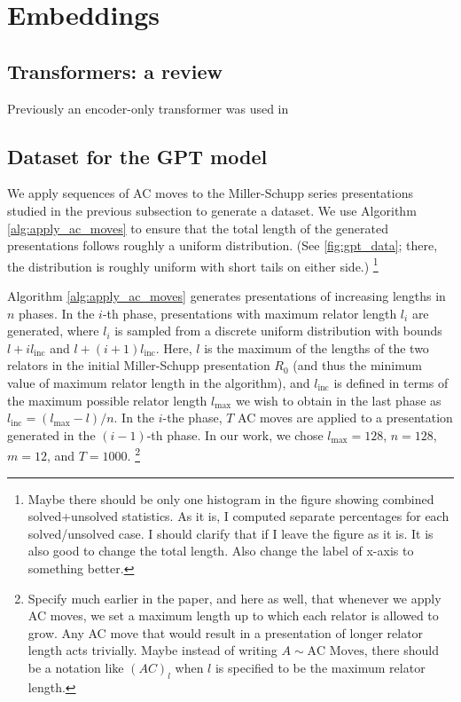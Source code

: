 
\section{Embeddings}

\subsection{Transformers: a review}

Previously an encoder-only transformer was used in

\subsection{Dataset for the GPT model}

We apply sequences of AC moves to the Miller-Schupp series presentations studied in the previous subsection to generate a dataset.
We use Algorithm \autoref{alg:apply_ac_moves} to ensure that the total length of the generated presentations follows roughly a uniform distribution.
(See \autoref{fig:gpt_data}; there, the distribution is roughly uniform with short tails on either side.)
\footnote{Maybe there should be only one histogram in the figure showing combined solved+unsolved statistics.
As it is, I computed separate percentages for each solved/unsolved case.
I should clarify that if I leave the figure as it is.
It is also good to change the total length.
Also change the label of x-axis to something better.}

Algorithm \autoref{alg:apply_ac_moves} generates presentations of increasing lengths in $n$ phases.
In the $i$-th phase, presentations with maximum relator length $l_i$ are generated, where $l_i$ is sampled from a discrete uniform distribution with bounds $l + i l_{\text{inc}} $ and $l + (i+1) l_{\text{inc}}$.
Here, $l$ is the maximum of the lengths of the two relators in the initial Miller-Schupp presentation $R_0$ (and thus the minimum value of maximum relator length in the algorithm), and $l_{\text{inc}}$ is defined in terms of the maximum possible relator length $l_{\text{max}}$ we wish to obtain in the last phase as $l_{\text{inc}} = (l_{\text{max}}-l)/n$.
In the $i$-the phase, $T$ AC moves are applied to a presentation generated in the $(i-1)$-th phase.
In our work, we chose $l_{\text{max}}=128$, $n=128$, $m=12$, and $T=1000$.
\footnote{Specify much earlier in the paper, and here as well, that whenever we apply AC moves, we set a maximum length up to which each relator is allowed to grow.
Any AC move that would result in a presentation of longer relator length acts trivially.
Maybe instead of writing $A \sim \text{AC Moves}$, there should be a notation like $(AC)_l$ when $l$ is specified to be the maximum relator length.}

